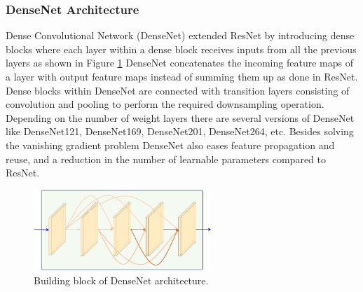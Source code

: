\subsubsection{DenseNet Architecture}
Dense Convolutional Network (DenseNet) \cite{DenseNetRef} extended ResNet by introducing dense blocks where each layer within a dense block receives inputs from all the previous layers as shown in Figure \ref{fig:densenet} DenseNet concatenates the incoming feature maps of a layer with output feature maps instead of summing them up as done in ResNet. Dense blocks within DenseNet are connected with transition layers consisting of convolution and pooling to perform the required downsampling operation. Depending on the number of weight layers there are several versions of DenseNet like DenseNet121, DenseNet169, DenseNet201, DenseNet264, etc. Besides solving the vanishing gradient problem DenseNet also eases feature propagation and reuse, and a reduction in the number of learnable parameters compared to ResNet.
\begin{figure}[htb!]
	\centering
	\includegraphics[width=0.6\textwidth,keepaspectratio]{images/pretraining/dense-cropped.pdf}
	\caption[Building block of DenseNet architecture]{Building block of DenseNet architecture.}
	\label{fig:densenet}
\end{figure}

